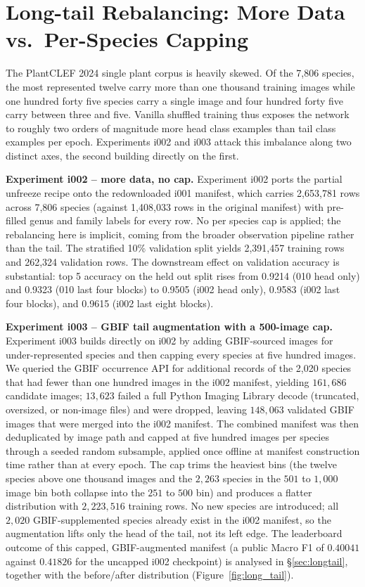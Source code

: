 \section{Long-tail Rebalancing: More Data vs.\ Per-Species Capping}
\label{sec:cap_extra_detail}

The PlantCLEF 2024 single plant corpus is heavily skewed. Of the 7,806 species, the most
represented twelve carry more than one thousand training images while one hundred forty five
species carry a single image and four hundred forty five carry between three and five. Vanilla
shuffled training thus exposes the network to roughly two orders of magnitude more head class
examples than tail class examples per epoch. Experiments i002 and i003 attack this imbalance
along two distinct axes, the second building directly on the first.

\textbf{Experiment i002 -- more data, no cap.} Experiment i002 ports the partial unfreeze recipe
onto the redownloaded i001 manifest, which carries 2,653,781 rows across 7,806 species (against
1,408,033 rows in the original manifest) with pre-filled genus and family labels for every row.
No per species cap is applied; the rebalancing here is implicit, coming from the broader
observation pipeline rather than the tail. The stratified 10\% validation split yields 2,391,457
training rows and 262,324 validation rows. The downstream effect on validation accuracy is
substantial: top 5 accuracy on the held out split rises from 0.9214 (010 head only) and 0.9323
(010 last four blocks) to 0.9505 (i002 head only), 0.9583 (i002 last four blocks), and 0.9615
(i002 last eight blocks).

\textbf{Experiment i003 -- GBIF tail augmentation with a 500-image cap.} Experiment i003 builds
directly on i002 by adding GBIF-sourced images for under-represented species and then capping
every species at five hundred images. We queried the GBIF occurrence API for additional records
of the 2,020 species that had fewer than one hundred images in the i002 manifest, yielding
$161{,}686$ candidate images; $13{,}623$ failed a full Python Imaging Library decode (truncated,
oversized, or non-image files) and were dropped, leaving $148{,}063$ validated GBIF images that
were merged into the i002 manifest. The combined manifest was then deduplicated by image path and
capped at five hundred images per species through a seeded random subsample, applied once offline
at manifest construction time rather than at every epoch. The cap trims the heaviest bins (the
twelve species above one thousand images and the $2{,}263$ species in the $501$ to $1{,}000$ image
bin both collapse into the $251$ to $500$ bin) and produces a flatter distribution with
$2{,}223{,}516$ training rows. No new species are introduced; all $2{,}020$ GBIF-supplemented
species already exist in the i002 manifest, so the augmentation lifts only the head of the tail,
not its left edge. The leaderboard outcome of this capped, GBIF-augmented manifest (a public
Macro F1 of $0.40041$ against $0.41826$ for the uncapped i002 checkpoint) is analysed in
\S\ref{sec:longtail}, together with the before/after distribution (Figure~\ref{fig:long_tail}).

